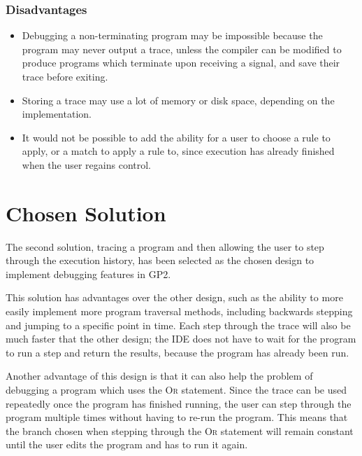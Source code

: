 \documentclass[authoryearcitations]{UoYCSproject}
\begin{document}

\subsubsection{Disadvantages}
\label{sec:ProposedDesign2Disadvantages}

\begin{itemize}
    \item Debugging a non-terminating program may be impossible because the
          program may never output a trace, unless the compiler can be modified
          to produce programs which terminate upon receiving a signal, and save
          their trace before exiting.

    \item Storing a trace may use a lot of memory or disk space, depending on
          the implementation.

    \item It would not be possible to add the ability for a user to choose a
          rule to apply, or a match to apply a rule to, since execution has
          already finished when the user regains control.
\end{itemize}


\section{Chosen Solution}
\label{sec:ChosenSolution}

The second solution, tracing a program and then allowing the user to step through
the execution history, has been selected as the chosen design to implement
debugging features in GP2.

This solution has advantages over the other design, such as the ability to
more easily implement more program traversal methods, including backwards
stepping and jumping to a specific point in time. Each step through the trace
will also be much faster that the other design; the IDE does not have to wait
for the program to run a step and return the results, because the program has
already been run.

Another advantage of this design is that it can also help the problem of debugging
a program which uses the \textsc{Or} statement. Since the trace can be used
repeatedly once the program has finished running, the user can step through the
program multiple times without having to re-run the program. This means that 
the branch chosen when stepping through the \textsc{Or} statement will remain
constant until the user edits the program and has to run it again.
\end{document}
